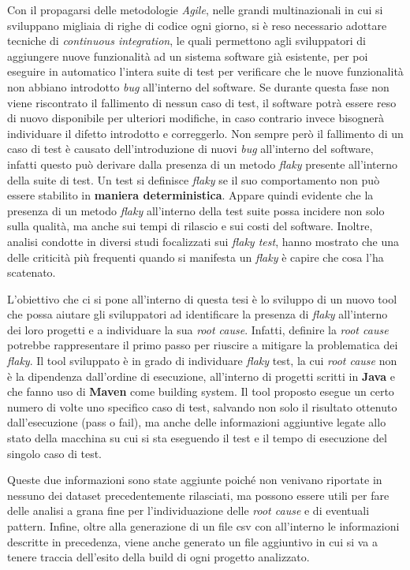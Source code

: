 \pagestyle{fancy}
\fancyhf{}
\fancyhead[C]{}
\fancyfoot[C]{\thepage}
\pagestyle{fancy}
Con il propagarsi delle metodologie \emph{Agile}, nelle grandi multinazionali in cui
si sviluppano migliaia di righe di codice ogni giorno, si è reso necessario adottare tecniche di \emph{continuous integration}, le quali permettono agli sviluppatori di
aggiungere nuove funzionalità ad un sistema software già esistente, per poi eseguire
in automatico l’intera suite di test per verificare che le nuove funzionalità non abbiano introdotto \emph{bug} all’interno del software. Se durante questa fase non viene riscontrato il fallimento di nessun caso di test, il software potrà essere reso di nuovo
disponibile per ulteriori modifiche, in caso contrario invece bisognerà individuare il difetto introdotto e correggerlo. Non sempre però il fallimento di un caso di test è causato dell’introduzione di nuovi \emph{bug} all’interno del software, infatti questo può
derivare dalla presenza di un metodo \emph{flaky} presente all’interno della suite di test.
Un test si definisce \emph{flaky} se il suo comportamento non può essere stabilito in \textbf{maniera deterministica}. Appare quindi evidente che la presenza di un metodo \emph{flaky}
all’interno della test suite possa incidere non solo sulla qualità, ma anche sui tempi di rilascio e sui costi del software. Inoltre, analisi condotte in diversi studi
focalizzati sui \emph{flaky test}, hanno mostrato che una delle criticità più frequenti quando si manifesta un \emph{flaky} è capire che cosa l’ha scatenato.

L’obiettivo che ci si pone all’interno di questa tesi è lo sviluppo di un nuovo tool che possa aiutare gli sviluppatori ad identificare la presenza di \emph{flaky} all’interno
dei loro progetti e a individuare la sua \emph{root cause}. Infatti, definire la \emph{root cause}
potrebbe rappresentare il primo passo per riuscire a mitigare la problematica dei
\emph{flaky}. Il tool sviluppato è in grado di individuare \emph{flaky} test, la cui \emph{root cause} non è
la dipendenza dall’ordine di esecuzione, all’interno di progetti scritti in \textbf{Java} e che fanno uso di \textbf{Maven} come building system. Il tool proposto esegue un certo numero
di volte uno specifico caso di test, salvando non solo il risultato ottenuto dall’esecuzione (pass o fail), ma anche delle informazioni aggiuntive legate allo stato della macchina su cui si sta eseguendo il test e il tempo di esecuzione del singolo caso di test.

Queste due informazioni sono state aggiunte poiché non venivano riportate in nessuno dei dataset precedentemente rilasciati, ma possono essere utili per fare delle analisi a grana fine per l'individuazione delle \emph{root cause} e di eventuali pattern.
Infine, oltre alla generazione di un file csv con all’interno le informazioni descritte in precedenza, viene anche generato un file aggiuntivo in cui si va a tenere traccia dell’esito della build di ogni progetto analizzato.

